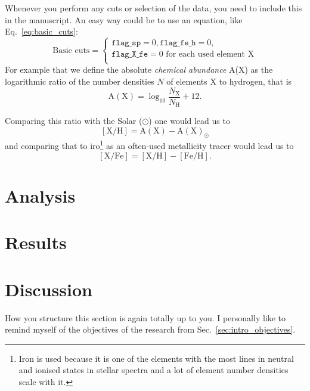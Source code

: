\documentclass[fleqn,usenatbib]{mnras}
\begin{document}
Whenever you perform any cuts or selection of the data, you need to include this in the manuscript. An easy way could be to use an equation, like Eq.~\ref{eq:basic_cuts}:
\begin{equation} \label{eq:basic_cuts}
\text{Basic cuts} = 
\begin{cases}
\texttt{flag\_sp} = 0, \texttt{flag\_fe\_h} = 0, \\
\texttt{flag\_X\_fe} = 0 \text{ for each used element X} \\
\end{cases}
\end{equation}
 For example that we define the absolute \textit{chemical abundance} A(X) as the logarithmic ratio of the number densities $N$ of elements X to hydrogen, that is 
\begin{equation}
\mathrm{A(X)} = \log_{10} \frac{N_\text{X}}{N_\text{H}} + 12.   
\end{equation}

Comparing this ratio with the Solar ($\odot$) one would lead us to 
\begin{equation}
\mathrm{[X/H]} = \mathrm{A(X)} - \mathrm{A(X)}_\odot    
\end{equation}
and comparing that to iro\footnote{Iron is used because it is one of the elements with the most lines in neutral and ionised states in stellar spectra and a lot of element number densities scale with it.} as an often-used metallicity tracer would lead us to
\begin{equation}
\mathrm{[X/Fe]} = \mathrm{[X/H]} - \mathrm{[Fe/H]}.
\end{equation}


\section{Analysis} \label{sec:analysis}

\section{Results} \label{sec:results}

\section{Discussion} \label{sec:discussion}

How you structure this section is again totally up to you. I personally like to remind myself of the objectives of the research from Sec.~\ref{sec:intro_objectives}.
\end{document}
